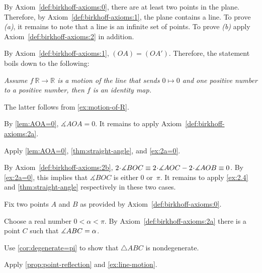 \setcounter{eqtn}{0}

 By Axiom~\ref{def:birkhoff-axioms:0}, there are at least two points in the plane.
Therefore, by Axiom~\ref{def:birkhoff-axioms:1}, 
the plane contains a line. 
To prove \textit{(a)}, it remains to note that a line is an infinite set of points.
To prove \textit{(b)} apply Axiom~\ref{def:birkhoff-axioms:2} in addition.

\parbf{\ref{ex:[OA)=[OA')}.}
By Axiom~\ref{def:birkhoff-axioms:1},
$(OA)=(OA')$.
Therefore, the statement boils down to the following:

\textit{Assume $f\:\mathbb{R}\to \mathbb{R}$ is a motion of the line that sends $0\mapsto 0$ and one positive number to a positive number, then $f$ is an identity map.}

The latter follows from \ref{ex:motion-of-R}.

By \ref{lem:AOA=0},
$\measuredangle AOA=0$.
It remains to apply Axiom~\ref{def:birkhoff-axioms:2a}.

Apply \ref{lem:AOA=0},
\ref{thm:straight-angle},
and \ref{ex:2a=0}.

By Axiom~\ref{def:birkhoff-axioms:2b},
$2\cdot\measuredangle BOC
\equiv 
2\cdot\measuredangle AOC\z-2\cdot \measuredangle AOB
\equiv 0$.
By \ref{ex:2a=0}, 
this implies that 
$\measuredangle BOC$ is either $0$ or~$\pi$.
It remains to apply \ref{ex:2.4} and \ref{thm:straight-angle} respectively in these two cases.

Fix two points $A$ and $B$ as provided by Axiom~\ref{def:birkhoff-axioms:0}.

Choose a real number $0<\alpha<\pi$.
By Axiom~\ref{def:birkhoff-axioms:2a} there is a point $C$ such that $\measuredangle ABC=\alpha$.

Use \ref{cor:degenerate=pi} to show that $\triangle ABC$ is nondegenerate.


 Apply \ref{prop:point-reflection} and \ref{ex:line-motion}.

